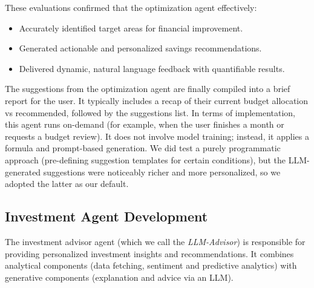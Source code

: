 \documentclass{scrartcl}
\begin{document}
These evaluations confirmed that the optimization agent effectively:
\begin{itemize}
    \item Accurately identified target areas for financial improvement.
    \item Generated actionable and personalized savings recommendations.
    \item Delivered dynamic, natural language feedback with quantifiable results.
\end{itemize}


The suggestions from the optimization agent are finally compiled into a brief report for the user. It typically includes a recap of their current budget allocation vs recommended, followed by the suggestions list. In terms of implementation, this agent runs on-demand (for example, when the user finishes a month or requests a budget review). It does not involve model training; instead, it applies a formula and prompt-based generation. We did test a purely programmatic approach (pre-defining suggestion templates for certain conditions), but the LLM-generated suggestions were noticeably richer and more personalized, so we adopted the latter as our default.

\subsection{Investment Agent Development}
The investment advisor agent (which we call the \textit{LLM-Advisor}) is responsible for providing personalized investment insights and recommendations. It combines analytical components (data fetching, sentiment and predictive analytics) with generative components (explanation and advice via an LLM). 
\end{document}
